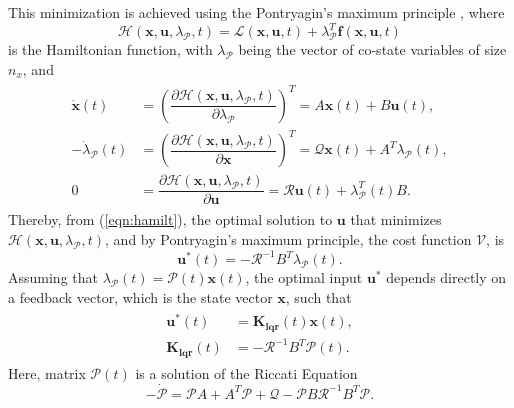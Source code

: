 This minimization is achieved using the Pontryagin's maximum principle \cite{Murray2009}, where
\begin{equation}
\mathcal{H}(\mathbf{x},\mathbf{u},\lambda_\mathcal{P},t) = \mathcal{L}(\mathbf{x},\mathbf{u},t) + \lambda_\mathcal{P}^{T}\mathbf{f}(\mathbf{x}, \mathbf{u}, t)
\end{equation}
is the Hamiltonian function, with $\lambda_\mathcal{P}$ being the vector of co-state variables of size $\mathit{n_x}$, and
\begin{align}
\label{eqn:hamilt}
\begin{split}
\dot{\mathbf{x}}(t) & = \left(\dfrac{\partial \mathcal{H}(\mathbf{x},\mathbf{u},\lambda_\mathcal{P},t)}{\partial \lambda_\mathcal{P}}\right)^{T} = A\mathbf{x}(t)+B\mathbf{u}(t),\\[5px]
-\dot{\lambda}_{\mathcal{P}}(t) & = \left(\dfrac{\partial \mathcal{H}(\mathbf{x},\mathbf{u},\lambda_\mathcal{P},t)}{\partial \mathbf{x}}\right)^{T} = \mathcal{Q}\mathbf{x}(t) + A^{T}\lambda_{\mathcal{P}}(t),\\[5px]
0 & = \dfrac{\partial \mathcal{H}(\mathbf{x},\mathbf{u},\lambda_\mathcal{P},t)}{\partial \mathbf{u}} = \mathcal{R}\mathbf{u}(t) + \lambda_\mathcal{P}^{T}(t)B.
\end{split}
\end{align}
Thereby, from (\ref{eqn:hamilt}), the optimal solution to $\mathbf{u}$ that minimizes $\mathcal{H}(\mathbf{x},\mathbf{u},\lambda_\mathcal{P},t)$, and by Pontryagin's maximum principle, the cost function $\mathcal{V}$, is
\begin{equation}
\mathbf{u}^{*}(t) = -\mathcal{R}^{-1}B^{T}\lambda_\mathcal{P}(t).
\end{equation}
Assuming that $\lambda_\mathcal{P}(t) = \mathcal{P}(t)\mathbf{x}(t)$, the optimal input $\mathbf{u}^{*}$ depends directly on a feedback vector, which is the state vector $\mathbf{x}$, such that
\begin{align}
\label{eqn:optimalu}
\begin{split}
\mathbf{u}^{*}(t) & = \mathbf{K_{lqr}}(t)\mathbf{x}(t),\\[5px]
\mathbf{K_{lqr}}(t) & = -\mathcal{R}^{-1}B^{T}\mathcal{P}(t).
\end{split}
\end{align}
Here, matrix $\mathcal{P}(t)$ is a solution of the Riccati Equation \cite{Moore1989}
	\begin{equation}
	-\dot{\mathcal{P}} = \mathcal{P}A + A^{T}\mathcal{P} + \mathcal{Q} - \mathcal{P}B\mathcal{R}^{-1}B^{T}\mathcal{P}.
	\end{equation}
